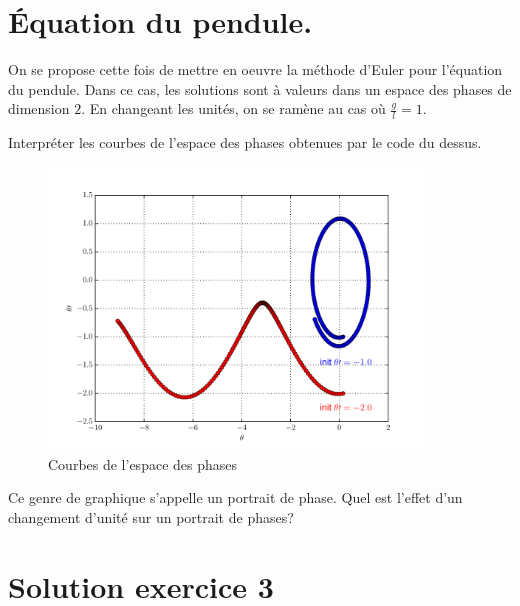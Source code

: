 \section{\'Equation du pendule.}
On se propose cette fois de mettre en oeuvre la méthode d'Euler pour l'équation du pendule. Dans ce cas, les solutions sont à valeurs dans un espace des phases de dimension $2$. En changeant les unités, on se ramène au cas où $\frac{g}{l}=1$. 

Interpréter les courbes de l'espace des phases obtenues par le code du dessus.
\begin{figure}[h]
  \centering
  \includegraphics[width=10cm]{./resolnumeqdiff_1_fig.pdf}
  \caption{Courbes de l'espace des phases}
  \label{fig:resolnumeqdiff_1}
\end{figure}
Ce genre de graphique s'appelle un portrait de phase. Quel est l'effet d'un changement d'unité sur un portrait de phases?

\section{Solution exercice 3}


